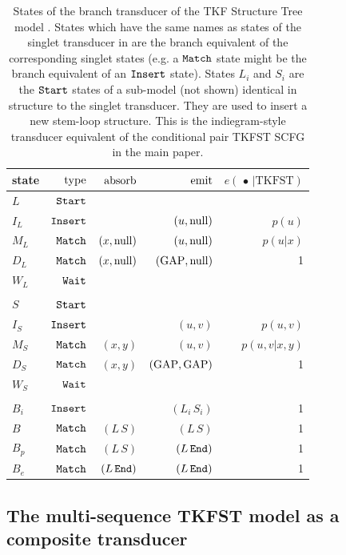 \documentclass[10pt]{article}
\begin{document}
\begin{table}[!ht]
  \centering
  \begin{tabular}{lrrrr}
    state & $\operatorname{type}$ & $\operatorname{absorb}$ & $\operatorname{emit}$ & $e(\,\bullet\,|\mathrm{TKFST})$ \\ \hline
    $L$ & $\mathtt{Start}$ \\
    $I_L$ & $\mathtt{Insert}$ & & $(u,\mathrm{null})$ & $p(u)$ \\
    $M_L$ & $\mathtt{Match}$ & $(x,\mathrm{null})$ & $(u,\mathrm{null})$ & $p(u|x)$ \\
    $D_L$ & $\mathtt{Match}$ & $(x,\mathrm{null})$ & $(\mathrm{GAP},\mathrm{null})$ & 1 \\
    $W_L$ & $\mathtt{Wait}$ \\
    \\
    $S$ & $\mathtt{Start}$ \\
    $I_S$ & $\mathtt{Insert}$ & & $(u,v)$ & $p(u,v)$ \\
    $M_S$ & $\mathtt{Match}$ & $(x,y)$ & $(u,v)$ & $p(u,v|x,y)$ \\
    $D_S$ & $\mathtt{Match}$ & $(x,y)$ & $(\mathrm{GAP},\mathrm{GAP})$ & 1 \\
    $W_S$ & $\mathtt{Wait}$ \\
    \\
    $B_i$ & $\mathtt{Insert}$ & & $(L_i\,S_i)$ & 1 \\
    $B$ & $\mathtt{Match}$ & $(L\,S)$ & $(L\,S)$ & 1 \\
    $B_p$ & $\mathtt{Match}$ & $(L\,S)$ & $(L\,\mathtt{End})$ & 1 \\
    $B_e$ & $\mathtt{Match}$ & $(L\,\mathtt{End})$ & $(L\,\mathtt{End})$ & 1 \\
  \end{tabular}
  \caption{
    States of the branch transducer of the TKF Structure Tree model \cite{Holmes2004}.
    States which have the same names as states of the singlet transducer in 
    are the branch equivalent of the corresponding singlet states
    (e.g. a $\mathtt{Match}$ state might be the branch equivalent of an $\mathtt{Insert}$ state).
    States $L_i$ and $S_i$ are the $\mathtt{Start}$ states of a sub-model (not shown) identical
    in structure to the singlet transducer.  They are used to insert a new stem-loop structure.
    This is the indiegram-style transducer equivalent of the conditional pair TKFST SCFG in the main paper.
  }
\end{table}




\subsection{The multi-sequence TKFST model as a composite transducer}
\end{document}
